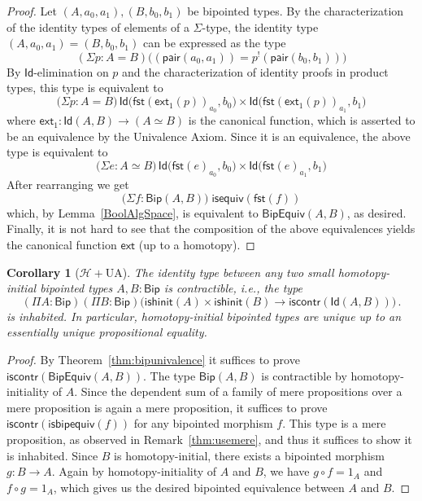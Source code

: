 \documentclass[10pt,a4paper,oneside,reqno]{amsart}
\numberwithin{equation}{section}
\theoremstyle{mythm}
\newtheorem{corollary}[theorem]{Corollary}
\theoremstyle{mydef}
\theoremstyle{myrmk}
\newcommand{\co}{\colon}
\newcommand{\comp}{\circ}
\newcommand{\Hint}{\mathcal{H}}
\newcommand{\iscontr}{\mathsf{iscontr}}
\newcommand{\isequiv}{\mathsf{isequiv}}
\newcommand{\ext}{\mathsf{ext}}
\newcommand{\pair}{\mathsf{pair}}
\newcommand{\fst}{\mathsf{fst}}
\newcommand{\Id}{\mathsf{Id}}
\newcommand{\Bip}{\mathsf{Bip}}
\newcommand{\BipHom}{\mathsf{Bip}}
\newcommand{\isbipequiv}{\mathsf{isbipequiv}}
\newcommand{\BipEquiv}{\mathsf{BipEquiv}}
\newcommand{\ishinitial}{\mathsf{ishinit}}
\begin{document}
\begin{proof} 
Let $ (A,a_0,a_1), (B,b_0,b_1)$ be bipointed types. By the characterization of the identity types
of  elements of a $\Sigma$-type, the 
identity type $(A,a_0,a_1) = (B,b_0,b_1)$ can be expressed as the type
\[(\Sigma p : A = B) \big((\pair(a_0,a_1)) = p^{!}(\pair(b_0,b_1)) \big)\]
By $\Id$-elimination on $p$ and the characterization of identity proofs in product types, this type is equivalent to
\[ \big(\Sigma p : A = B \big) \, \Id \big(\fst(\ext_1(p))_{a_0},  b_0\big) \times \Id \big( \fst(\ext_1(p))_{a_1} , b_1\big) \]
where $\ext_1 \co \Id(A,B) \to (A \simeq B)$ is the canonical function, which is asserted to be an equivalence by the
Univalence Axiom. Since it is an equivalence, the above type is equivalent to
\[ \big(\Sigma e : A \simeq B \big) \, \Id \big(\fst(e)_{a_0},  b_0\big) \times \Id \big( \fst(e)_{a_1} , b_1\big) \]
After rearranging we get
\[
 \big(\Sigma f \co \BipHom(A,B)\big) \; \isequiv(\fst(f))
\]
which, by Lemma~\ref{BoolAlgSpace}, is equivalent to $\BipEquiv(A,B)$, as desired. Finally, it is not hard to see that the composition of the above equivalences yields the canonical function $\ext$ (up to a homotopy).
\end{proof} 

\begin{corollary}[$\Hint + \mathrm{UA}$] \label{BoolHInitIso}
The identity type between any two small homotopy-initial bipointed types $A,B : \Bip$ is contractible, i.e., the type
\[ 
(\Pi A \co \Bip)(\Pi B \co \Bip) 
\big( \ishinitial(A) \times \ishinitial(B) \to \iscontr(\Id(A,B)) \big) \, .
\] 
is inhabited. In particular, homotopy-initial bipointed types are unique up to an essentially unique
propositional equality.
\end{corollary}

\begin{proof}
By Theorem~\ref{thm:bipunivalence} it suffices to prove $\iscontr(\BipEquiv(A,B))$. The type 
$\BipHom( A, B)$ is contractible by homotopy-initiality of $A$. Since the dependent sum of a family of mere propositions over a mere proposition is again a mere proposition, it suffices to prove $\iscontr(\isbipequiv(f))$ for any bipointed morphism $f$. This type is a mere proposition, as observed in Remark~\ref{thm:usemere}, and thus it suffices to show it is inhabited.
Since $B$ is homotopy-initial, there exists a bipointed morphism $g : B \to A$. Again by homotopy-initiality of $A$ and $B$, we have $g \comp f = 1_A$ and~$f \comp g = 1_A$, which gives us the desired bipointed equivalence between $A$ and $B$.
\end{proof}
\end{document}
